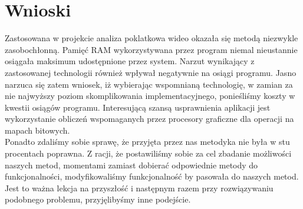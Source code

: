 \documentclass[a4paper]{article}
\begin{document}
\section{Wnioski}
Zastosowana w projekcie analiza poklatkowa wideo okazała się metodą niezwykle zasobochłonną. Pamięć RAM wykorzystywana przez program niemal nieustannie osiągała maksimum udostępnione przez system. Narzut wynikający z zastosowanej technologii również wpływał negatywnie na osiągi programu. Jasno narzuca się zatem wniosek, iż wybierając wspomnianą technologię, w zamian za nie najwyższy poziom skomplikowania implementacyjnego, ponieśliśmy koszty w kwestii osiągów programu. Interesującą szansą usprawnienia aplikacji jest wykorzystanie obliczeń wspomaganych przez procesory graficzne dla operacji na mapach bitowych.\\
Ponadto zdaliśmy sobie sprawę, że przyjęta przez nas metodyka nie była w stu procentach poprawna. Z racji, że postawiliśmy sobie za cel zbadanie możliwości naszych metod, momentami zamiast dobierać odpowiednie metody do funkcjonalności, modyfikowaliśmy funkcjonalność by pasowała do naszych metod. Jest to ważna lekcja na przyszłość i następnym razem przy rozwiązywaniu podobnego problemu, przyjęlibyśmy inne podejście.
\end{document}
